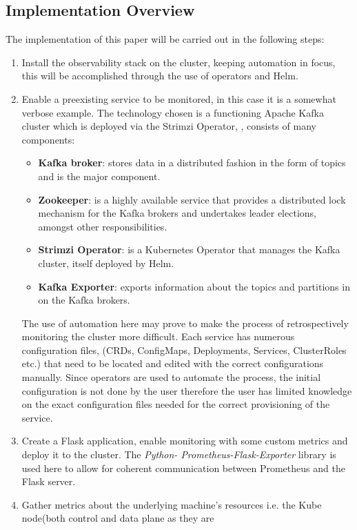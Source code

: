 \subsection{Implementation Overview}
The implementation of this paper will be carried out in the following steps:
\begin{enumerate}
	\item Install the observability stack on the cluster, keeping automation in focus, this will be accomplished through the
	      use of operators and Helm.
	\item Enable a preexisting service to be monitored, in this case it is a somewhat verbose example. The technology
	      chosen is a functioning Apache Kafka cluster which is deployed via the Strimzi Operator, , consists of many components:
	      \begin{itemize}
		      \item \textbf{Kafka broker}: stores data in a distributed fashion in the form of topics and is the major component.
		      \item \textbf{Zookeeper}: is a highly available service that provides a distributed lock mechanism for the Kafka brokers
		            and undertakes leader elections, amongst other responsibilities.
		      \item \textbf{Strimzi Operator}: is a Kubernetes Operator that manages the Kafka cluster, itself deployed by Helm.
		      \item \textbf{Kafka Exporter}: exports information about the topics and partitions in on the Kafka brokers.
	      \end{itemize}
	      The use of automation here may prove to make the process of retrospectively monitoring the cluster more difficult. Each service
	      has numerous configuration files, (CRDs, ConfigMaps, Deployments, Services, ClusterRoles etc.) that need to be
	      located and edited with the correct configurations manually. Since operators are used to automate the process, the
	      initial configuration is not done by the user therefore the user has limited knowledge on the exact configuration
	      files needed for the correct provisioning of the service.
	\item Create a Flask application, enable monitoring with some custom metrics and deploy it to the cluster. The \emph{Python-
		      Prometheus-Flask-Exporter} library\autocite{PrometheusflaskexporterPyPI} is used here to allow for coherent communication between Prometheus and the Flask server.
	\item Gather metrics about the underlying machine's resources i.e. the Kube node(both control and data plane as they are

\end{enumerate}
